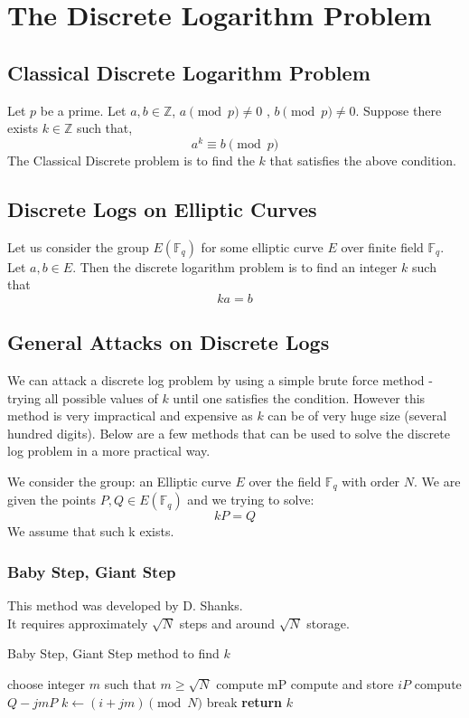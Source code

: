 \chapter{The Discrete Logarithm Problem}\label{chap:dlp}
\section{Classical Discrete Logarithm Problem}
Let $p$ be a prime. Let $a, b \in \mathbb{Z}$, $a\pmod{p} \neq 0$ , $b\pmod{p} \neq 0$. Suppose there exists $k \in \mathbb{Z}$ such that,
\[ a^k \equiv b \pmod{p}\]
The Classical Discrete problem is to find the $k$ that satisfies the above condition. 

\section{Discrete Logs on Elliptic Curves}
Let us consider the group $E(\mathbb{F}_q)$ for some elliptic curve $E$ over finite field $\mathbb{F}_q$. Let $a, b \in E$. Then the discrete logarithm problem is to find an integer $k$ such that
\[ka = b\]

\section{General Attacks on Discrete Logs}
We can attack a discrete log problem by using a simple brute force method - trying all possible values of $k$ until one satisfies the condition. However this method is very impractical and expensive as $k$ can be of very huge size (several hundred digits). Below are a few methods that can be used to solve the discrete log problem in a more practical way.

\par We consider the group: an Elliptic curve $E$ over the field $\mathbb{F}_q$ with order $N$. We are given the points $P, Q \in E(\mathbb{F}_q)$ and we trying to solve:
\[kP = Q\]
We assume that such k exists.

\subsection{Baby Step, Giant Step}
This method was developed by D. Shanks. \\
It requires approximately $\sqrt{N}$ steps and around $\sqrt{N}$ storage. \cite{Washington:book:2008}
\begin{algorithm}
\caption{Baby Step, Giant Step method to find $k$}\label{BSGS_DLP}
\begin{algorithmic}[1]
\State choose integer $m$ such that $m \geq \sqrt{N}$ 
\State compute mP
\State compute and store $iP$
\EndFor
{}
\State compute $Q - jmP$
\State $k \gets (i + jm)\pmod{N}$
\State break 
\EndIf
\EndFor
\State \textbf{return} $k$
\EndProcedure
\end{algorithmic}
\end{algorithm}

